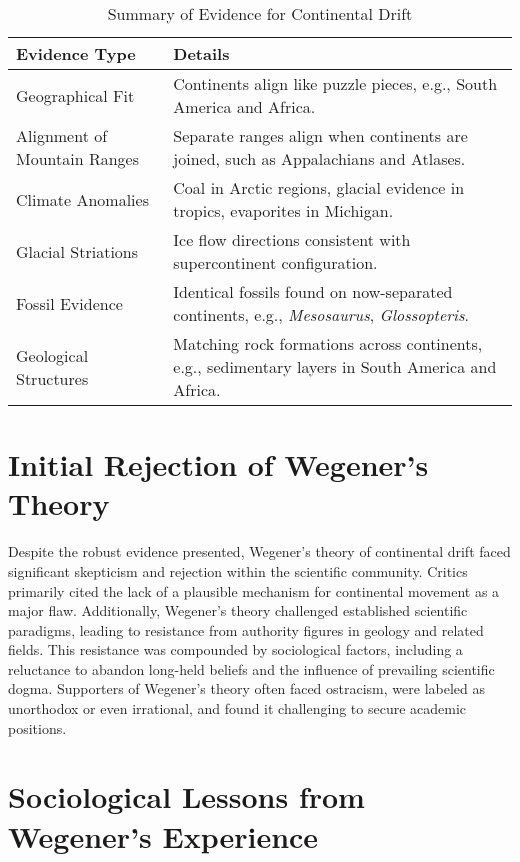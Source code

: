 \documentclass{article}
\begin{document}
\begin{table}[h!]
    \centering
    \caption{Summary of Evidence for Continental Drift}
    \begin{tabular}{@{}ll@{}}
        \toprule
        \textbf{Evidence Type}       & \textbf{Details} \\ 
        \midrule
        Geographical Fit             & Continents align like puzzle pieces, e.g., South America and Africa. \\ 
        Alignment of Mountain Ranges & Separate ranges align when continents are joined, such as Appalachians and Atlases. \\ 
        Climate Anomalies            & Coal in Arctic regions, glacial evidence in tropics, evaporites in Michigan. \\ 
        Glacial Striations           & Ice flow directions consistent with supercontinent configuration. \\ 
        Fossil Evidence              & Identical fossils found on now-separated continents, e.g., \textit{Mesosaurus}, \textit{Glossopteris}. \\ 
        Geological Structures        & Matching rock formations across continents, e.g., sedimentary layers in South America and Africa. \\ 
        \bottomrule
    \end{tabular}
\end{table}

\section{Initial Rejection of Wegener's Theory}

Despite the robust evidence presented, Wegener's theory of continental drift faced significant skepticism and rejection within the scientific community. Critics primarily cited the lack of a plausible mechanism for continental movement as a major flaw. Additionally, Wegener's theory challenged established scientific paradigms, leading to resistance from authority figures in geology and related fields. This resistance was compounded by sociological factors, including a reluctance to abandon long-held beliefs and the influence of prevailing scientific dogma. Supporters of Wegener's theory often faced ostracism, were labeled as unorthodox or even irrational, and found it challenging to secure academic positions.

\section{Sociological Lessons from Wegener's Experience}
\end{document}
